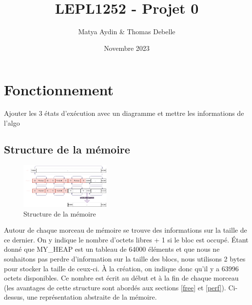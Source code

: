 \documentclass{article}
\title{LEPL1252 - Projet 0}
\author{Matya Aydin \& Thomas Debelle}
\date{Novembre 2023}
\begin{document}
\maketitle

\section{Fonctionnement}


Ajouter les 3 états d'exécution avec un diagramme et mettre les informations de l'algo

\subsection{Structure de la mémoire}

\begin{figure}
    \centering
    \includegraphics[width=0.4\textwidth, clip]{fonctionnement.png}
    \caption{Structure de la mémoire}
    \label{fct}

\end{figure}

Autour de chaque morceau de mémoire se trouve des informations sur la taille de ce dernier. On y indique le nombre d'octets libres + 1 si le bloc est occupé.
Étant donné que MY\_HEAP est un tableau de 64000 éléments et que nous ne souhaitons pas perdre d'information sur la taille des blocs, nous utilisons 2 bytes pour stocker la taille de ceux-ci.
À la création, on indique donc qu'il y a 63996 octets disponibles. Ce nombre est écrit au début et à la fin de chaque morceau (les avantages de cette structure sont abordés aux sections \ref{free} et \ref{perf}). Ci-dessus, une représentation abstraite de la mémoire.
\end{document}

